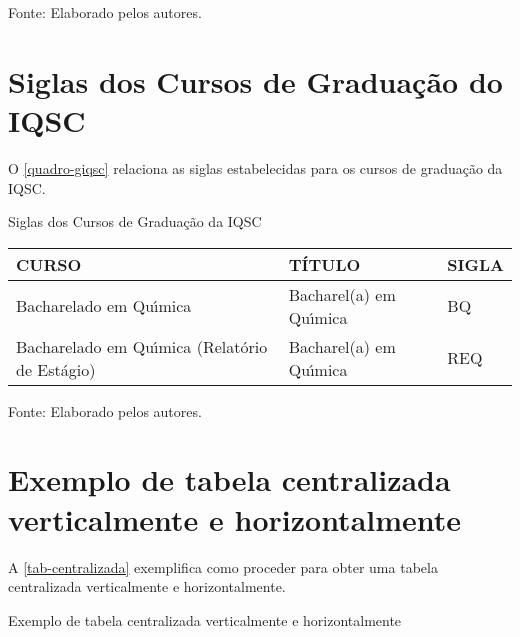 \begin{apendicesenv}
\begin{quadro}[Htb]
\begin{tabular}{|p{6.5cm}|p{6.5cm}|p{1.75cm}|}
	\end{tabular}
	\begin{flushleft}
		Fonte: Elaborado pelos autores.\
	\end{flushleft}
\end{quadro}

\chapter{Siglas dos Cursos de Gradua\c{c}\~ao do IQSC}
O \autoref{quadro-giqsc} relaciona as siglas estabelecidas para os cursos de gradua\c{c}\~ao da IQSC.
\begin{quadro}[Htb]
	\ABNTEXfontereduzida
	\caption[Siglas dos Cursos de Gradua\c{c}\~ao da IQSC]{Siglas dos Cursos de Gradua\c{c}\~ao da IQSC}
	\label{quadro-giqsc}
	\begin{tabular}{|p{6.5cm}|p{6.5cm}|p{1.75cm}|}
		\hline
		\textbf{CURSO} & \textbf{T\'ITULO} &  \textbf{SIGLA}  \\
		\hline
		Bacharelado em Qu\'{\i}mica & Bacharel(a) em Qu\'{\i}mica & BQ\\
		Bacharelado em Qu\'{\i}mica (Relat\'orio de Est\'agio)  & Bacharel(a) em Qu\'{\i}mica & REQ\\
		\hline
		
	\end{tabular}
	\begin{flushleft}
		Fonte: Elaborado pelos autores.\
	\end{flushleft}
\end{quadro}

\chapter{Exemplo de tabela centralizada verticalmente e horizontalmente}
\index{tabelas}A \autoref{tab-centralizada} exemplifica como proceder para obter uma tabela centralizada verticalmente e horizontalmente.
\begin{table}[Htb]
\ABNTEXfontereduzida
\caption[Exemplo de tabela centralizada verticalmente e horizontalmente]{Exemplo de tabela centralizada verticalmente e horizontalmente}
\label{tab-centralizada}


\end{table}
\end{apendicesenv}

